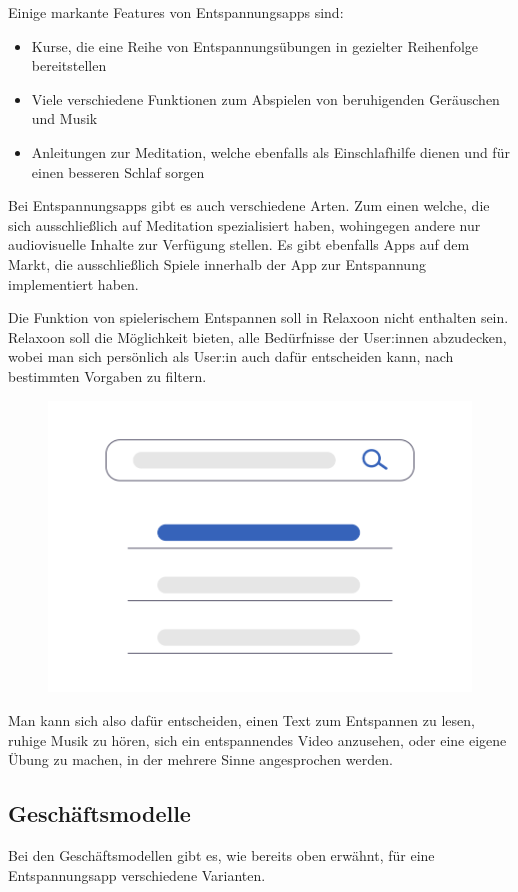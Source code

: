 Einige markante Features von Entspannungsapps sind:

\begin{itemize}
    \item Kurse, die eine Reihe von Entspannungsübungen in gezielter Reihenfolge bereitstellen
    \item Viele verschiedene Funktionen zum Abspielen von beruhigenden Geräuschen und Musik
    \item Anleitungen zur Meditation, welche ebenfalls als Einschlafhilfe dienen und für einen besseren Schlaf sorgen
\end{itemize}

Bei Entspannungsapps gibt es auch verschiedene Arten. Zum einen welche, die sich ausschließlich auf Meditation
spezialisiert haben, wohingegen andere nur audiovisuelle Inhalte zur Verfügung stellen. Es gibt ebenfalls Apps auf
dem Markt, die ausschließlich Spiele innerhalb der App zur Entspannung implementiert haben. 

Die Funktion von spielerischem Entspannen soll in Relaxoon nicht enthalten sein. Relaxoon soll
die Möglichkeit bieten, alle Bedürfnisse der User:innen abzudecken, wobei man sich persönlich als User:in 
auch dafür entscheiden kann, nach bestimmten Vorgaben zu filtern.

\begin{figure}[H]
    \centering
    \includegraphics[height=0.35\textwidth]{./pics/undraw_Search_re_x5gq.png}
    \caption{}
\end{figure}

Man kann sich also dafür entscheiden, einen Text
zum Entspannen zu lesen, ruhige Musik zu hören, sich ein entspannendes Video anzusehen, oder eine eigene Übung
zu machen, in der mehrere Sinne angesprochen werden.

\subsection{Geschäftsmodelle}

Bei den Geschäftsmodellen gibt es, wie bereits oben erwähnt, für eine Entspannungsapp verschiedene Varianten. 

